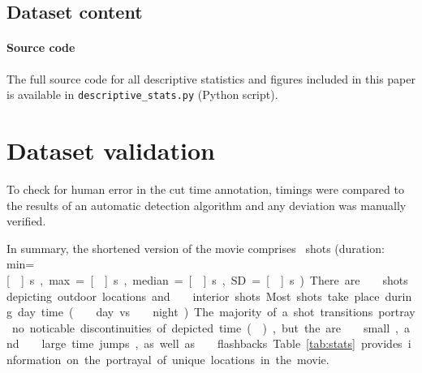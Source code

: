 \documentclass[10pt,a4paper,twocolumn]{article}
\begin{document}
\subsection*{Dataset content}


\paragraph{Source code}

The full source code for all descriptive statistics and figures included in
this paper is available in \texttt{descriptive\_stats.py} (Python script).


\section*{Dataset validation}

To check for human error in the cut time annotation, timings were compared to
the results of an automatic detection algorithm and any deviation was manually
verified.

In summary, the shortened version of the movie comprises \NShots\ shots
(duration: min=\unit[\ShotLengthMin]{s}, max=\unit[\ShotLengthMax]{s},
median=\unit[\ShotLengthMedian]{s}, SD=\unit[\ShotLengthSD]{s}). There are
\NExteriorShots\ shots depicting outdoor locations and \NInteriorShots\
interior shots. Most shots take place during day time (\NDayShots\ day
vs.~\NNightShots\ night). The majority of a shot transitions portray no
noticable discontinuities of depicted time (\NShotsTimeNoJump), but the are
\NShotsTimeSmallJump\ small, and \NShotsTimeLargeJump\ large time jumps, as
well as \NShotsTimeFlashback\ flashbacks.

Table \ref{tab:stats} provides information on the portrayal of unique locations
in the movie.
\end{document}

